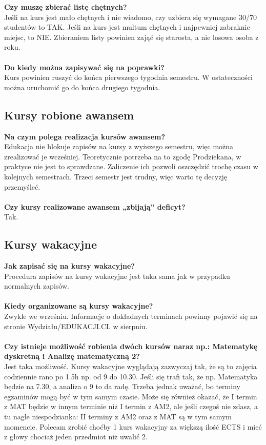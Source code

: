 \documentclass[11pt]{article}
\begin{document}
\textbf{Czy muszę zbierać listę chętnych?} \\
\indent Jeśli na kurs jest mało chętnych i nie wiadomo, czy uzbiera się wymagane 30/70 studentów to TAK. Jeśli na kurs jest multum chętnych i najpewniej zabraknie miejsc, to NIE. Zbieraniem listy powinien zająć się starosta, a nie losowa osoba z roku. \\\\
\textbf{Do kiedy można zapisywać się na poprawki?} \\
\indent Kurs powinien ruszyć do końca pierwszego tygodnia semestru. W ostateczności można uruchomić go do końca drugiego tygodnia.
\subsection{Kursy robione awansem}
\textbf{Na czym polega realizacja kursów awansem?} \\
\indent Edukacja nie blokuje zapisów na kursy z wyższego semestru, więc można zrealizować je wcześniej. Teoretycznie potrzeba na to zgodę Prodziekana, w praktyce nie jest to sprawdzane. Zaliczenie ich pozwoli oszczędzić trochę czasu w kolejnych semestrach. Trzeci semestr jest trudny, więc warto tę decyzję przemyśleć. \\\\
\textbf{Czy kursy realizowane awansem „zbijają” deficyt?} \\
\indent Tak.
\subsection{Kursy wakacyjne}
\textbf{Jak zapisać się na kursy wakacyjne?} \\
\indent Procedura zapisów na kursy wakacyjne jest taka sama jak w przypadku normalnych zapisów. \\\\
\textbf{Kiedy organizowane są kursy wakacyjne?} \\
\indent Zwykle we wrześniu. Informacje o dokładnych terminach powinny pojawić się na stronie Wydziału/EDUKACJI.CL w sierpniu. \\\\
\textbf{Czy istnieje możliwość robienia dwóch kursów naraz np.: Matematykę dyskretną i Analizę matematyczną 2?} \\
\indent Jest taka możliwość. Kursy wakacyjne wyglądają zazwyczaj tak, że są to zajęcia codziennie rano po 1.5h np. od 9 do 10.30. Jeśli się trafi tak, że np. Matematyka będzie na 7.30, a analiza o 9 to da radę. Trzeba jednak uważać, bo terminy egzaminów mogą być w tym samym czasie. Może się również okazać, że I termin z MAT będzie w innym terminie niż I termin z AM2, ale jeśli czegoś nie zdasz, a tu nagle niespodzianka: II terminy z AM2 oraz z MAT są w tym samym momencie. Polecam zrobić choćby 1 kurs wakacyjny za większą ilość ECTS i mieć z głowy chociaż jeden przedmiot niż uwalić 2.
\end{document}
